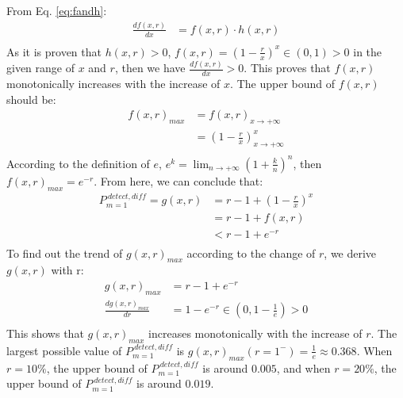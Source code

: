 \documentclass[sigconf]{acmart}
\begin{document}
From Eq. \ref{eq:fandh}:
\begin{equation}
\begin{split}
{\frac{df(x,r)}{dx}} &= f(x,r) \cdot h(x,r) \\
\end{split}
\end{equation}
As it is proven that $h(x,r) > 0$, $f(x,r)=(1-\frac{r}{x})^{x} \in (0,1) > 0$ in the given range of $x$ and $r$, then we have ${\frac{df(x,r)}{dx}} > 0$. This proves that $f(x,r)$ monotonically increases with the increase of $x$. The upper bound of $f(x,r)$ should be:
\begin{equation}
\begin{split}
f(x,r)_{max} &= f(x,r)_{x \rightarrow +\infty} \\
&= (1-\frac{r}{x})^{x} _{x \rightarrow +\infty} \\
\end{split}
\end{equation}
According to the definition of $e$, $e^k = \lim_{n \rightarrow +\infty} (1+\frac{k}{n})^{n}$, then $f(x,r)_{max} = e^{-r}$.
From here, we can conclude that:
\begin{equation}
\begin{split}
P_{m=1}^{\:detect,\mathit{diff}} = g(x,r) &= r - 1 + (1-\frac{r}{x})^{x} \\
&= r - 1 + f(x,r) \\
&< r - 1 + e^{-r} \\
\end{split}
\end{equation}
To find out the trend of $g(x,r)_{max}$ according to the change of $r$, we derive $g(x,r)$ with r:
\begin{equation}
\begin{split}
g(x,r)_{max} &= r - 1 + e^{-r} \\
\frac{dg(x,r)_{max} }{dr} &= 1 - e^{-r} \in (0, 1-\frac{1}{e}) > 0 \\
\end{split}
\end{equation}
This shows that $g(x,r)_{max}$ increases monotonically with the increase of $r$. The largest possible value of $P_{m=1}^{\:detect,\mathit{diff}}$ is $g(x,r)_{max}(r=1^-) = \frac{1}{e} \approx 0.368$. When $r = 10\%$, the upper bound of $P_{m=1}^{\:detect,\mathit{diff}}$ is around $0.005$, and when $r = 20\%$, the upper bound of $P_{m=1}^{\:detect,\mathit{diff}}$ is around $0.019$.
\end{document}

